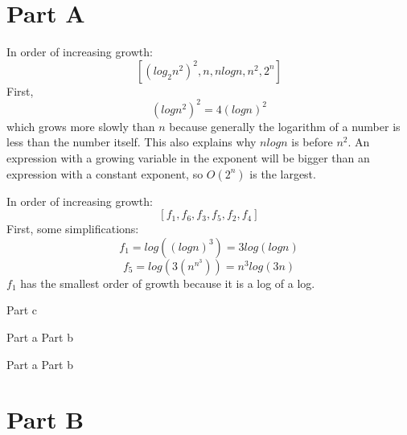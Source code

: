\documentclass[12pt,twoside]{article}
\begin{document}

\begin{problems}

\section*{Part A}

\problem  %

\begin{problemparts}
\problempart In order of increasing growth: $$[(log_2n^2)^2, n, nlogn,  n^2, 2^n ]$$
First,
$$(logn^2)^2 = 4(logn)^2$$ which grows more slowly than $n$ because generally the logarithm of a number is less than the number itself. This also explains why $nlogn$ is before $n^2$. An expression with a growing variable in the exponent will be bigger than an expression with a constant exponent, so $O(2^n)$ is the largest.

\problempart In order of increasing growth: $$[f_1, f_6, f_3, f_5, f_2, f_4]$$
First, some simplifications:
$$f_1 = log((logn)^3) = 3log(logn)$$
$$f_5 = log(3(n^{n^3})) = n^3log(3n)$$
$f_1$ has the smallest order of growth because it is a log of a log. 

\problempart Part c  %
\end{problemparts}

\problem  %

\begin{problemparts}
\problempart Part a %
\problempart Part b %
\end{problemparts}

\problem  %

\begin{problemparts}
\problempart Part a %
\problempart Part b %
\end{problemparts}

\section*{Part B}


\end{problems}
\end{document}
